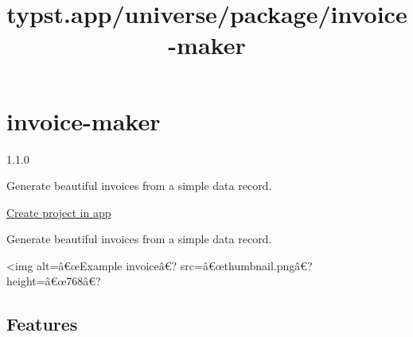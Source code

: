 \title{typst.app/universe/package/invoice-maker}

\label{banner}
\label{template-thumbnail}

\section{invoice-maker}\label{invoice-maker}

{ 1.1.0 }

Generate beautiful invoices from a simple data record.

\href{/app?template=invoice-maker&version=1.1.0}{Create project in app}

\label{readme}
Generate beautiful invoices from a simple data record.

\textless img alt=â€œExample invoiceâ€? src=â€œthumbnail.pngâ€?
height=â€œ768â€?

\begin{quote}
\end{quote}

\subsection{Features}\label{features}

